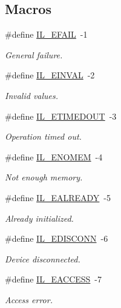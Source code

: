 \subsection*{Macros}
\begin{DoxyCompactItemize}
\item 
\#define \hyperlink{group__IL__ERR_ga19bb985b7d18cefc5aed42f9907fb2e0}{I\+L\+\_\+\+E\+F\+A\+IL}~-\/1
\begin{DoxyCompactList}\small\item\em General failure. \end{DoxyCompactList}\item 
\#define \hyperlink{group__IL__ERR_ga47cf82d575e6ab2f1af332b192f5a152}{I\+L\+\_\+\+E\+I\+N\+V\+AL}~-\/2
\begin{DoxyCompactList}\small\item\em Invalid values. \end{DoxyCompactList}\item 
\#define \hyperlink{group__IL__ERR_gac51a50be89cb8812586de3d7c403a3d2}{I\+L\+\_\+\+E\+T\+I\+M\+E\+D\+O\+UT}~-\/3
\begin{DoxyCompactList}\small\item\em Operation timed out. \end{DoxyCompactList}\item 
\#define \hyperlink{group__IL__ERR_gaf70f61bc8e6136b385edb92f72b0e676}{I\+L\+\_\+\+E\+N\+O\+M\+EM}~-\/4
\begin{DoxyCompactList}\small\item\em Not enough memory. \end{DoxyCompactList}\item 
\#define \hyperlink{group__IL__ERR_ga6450573c3dc43ce215afa857082692eb}{I\+L\+\_\+\+E\+A\+L\+R\+E\+A\+DY}~-\/5
\begin{DoxyCompactList}\small\item\em Already initialized. \end{DoxyCompactList}\item 
\#define \hyperlink{group__IL__ERR_ga09294945616872dde2c5ed98e257406d}{I\+L\+\_\+\+E\+D\+I\+S\+C\+O\+NN}~-\/6
\begin{DoxyCompactList}\small\item\em Device disconnected. \end{DoxyCompactList}\item 
\#define \hyperlink{group__IL__ERR_gaf8957a58cdc74c6cda94eb5bb990a26b}{I\+L\+\_\+\+E\+A\+C\+C\+E\+SS}~-\/7
\begin{DoxyCompactList}\small\item\em Access error. \end{DoxyCompactList}\item 

\end{DoxyCompactItemize}
